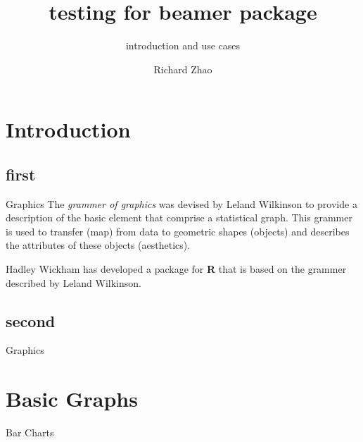 \documentclass[xcolor=dvipsnames]{beamer} %
\title[test]{testing for beamer package}
\subtitle[sub]{introduction and use cases}
\author[richard]{Richard Zhao}
\begin{document}




\begin{frame}
\titlepage
\end{frame}

\section{Introduction}
\subsection{first}
\begin{frame}{Graphics}
The \emph{grammer of graphics} was devised by Leland Wilkinson to provide a description of the basic element that comprise a statistical graph. This grammer is used to {\color{blue}transfer} (map) from data to geometric shapes (objects) and describes the attributes of these objects (aesthetics).

\alert{Hadley Wickham} has developed a package for \textbf{R} that is based on the grammer described by Leland Wilkinson.
\end{frame}

\subsection{second}
\begin{frame}{Graphics}

\end{frame}

\section{Basic Graphs}
\begin{frame}{Bar Charts}

\end{frame}
\end{document}
